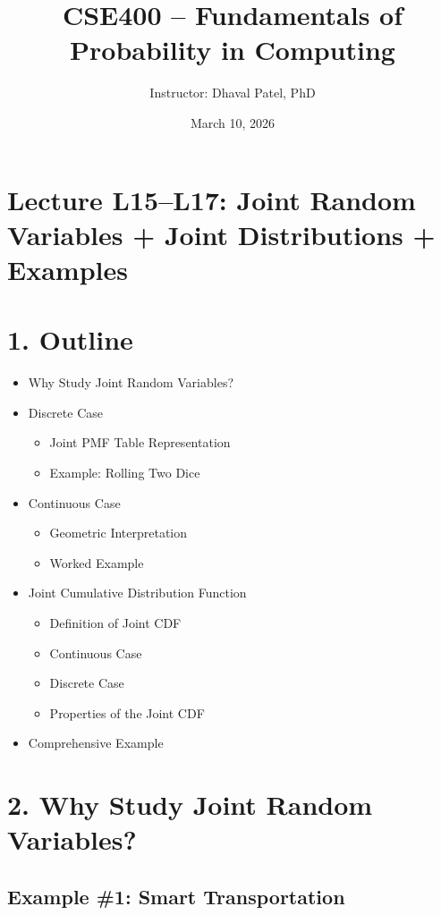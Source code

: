 \documentclass[12pt]{article}
\title{CSE400 -- Fundamentals of Probability in Computing}
\author{Instructor: Dhaval Patel, PhD}
\date{March 10, 2026}
\begin{document}
\maketitle

\section*{Lecture L15--L17: Joint Random Variables + Joint Distributions + Examples}

\section*{1. Outline}

\begin{itemize}
    \item Why Study Joint Random Variables?
    \item Discrete Case
    \begin{itemize}
        \item Joint PMF Table Representation
        \item Example: Rolling Two Dice
    \end{itemize}
    \item Continuous Case
    \begin{itemize}
        \item Geometric Interpretation
        \item Worked Example
    \end{itemize}
    \item Joint Cumulative Distribution Function
    \begin{itemize}
        \item Definition of Joint CDF
        \item Continuous Case
        \item Discrete Case
        \item Properties of the Joint CDF
    \end{itemize}
    \item Comprehensive Example
\end{itemize}

\section*{2. Why Study Joint Random Variables?}

\subsection*{Example \#1: Smart Transportation}
\end{document}
